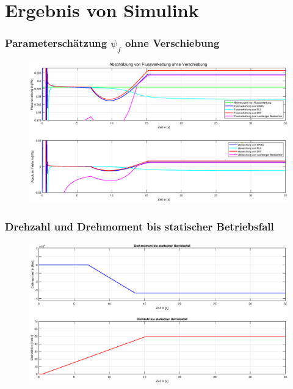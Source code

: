 \documentclass[serif,11pt, xcolor=table]{beamer}
\begin{document}
	\section{Ergebnis von Simulink}
	\begin{frame}
		\frametitle{Parameterschätzung $\psi_{f}  $ ohne Verschiebung}
		
		\begin{figure}[htbp]
			\centering
			\includegraphics[scale=0.30]{Abbildungen/OhneVerschiebung.eps}
			
		\end{figure}	
		
	\end{frame}
\begin{frame}
	\frametitle{Drehzahl und Drehmoment bis statischer Betriebsfall}
	
	\begin{figure}[htbp]
		\centering
		\includegraphics[scale=0.30]{Abbildungen/DrehmomentDrehzahl.eps}
		
	\end{figure}	
	
\end{frame}
\end{document}
